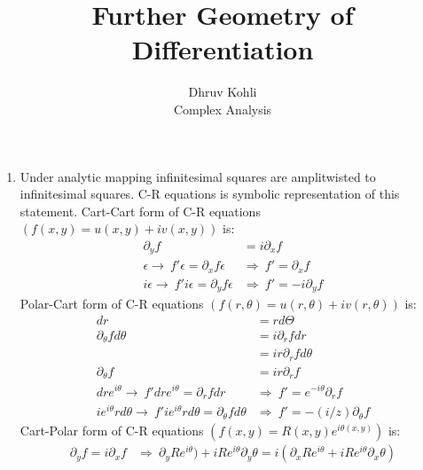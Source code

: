 \documentclass[12pt]{article}
\newcommand{\rto}{\rightarrow\ }
\newcommand{\Rto}{\Rightarrow\ }
\begin{document}
     
     
    \title{Further Geometry of Differentiation}%
    \author{Dhruv Kohli\\ %
    Complex Analysis} %
     
    \maketitle
    \begin{enumerate}
        \item Under analytic mapping infinitesimal squares are amplitwisted to infinitesimal squares. C-R equations is symbolic representation of this statement. Cart-Cart form of C-R equations $(f(x,y) = u(x,y)+iv(x,y))$ is:
        \begin{align*}
            \partial_{y}f &= i \partial_{x}f\\
            \epsilon \rto f' \epsilon = \partial_{x}f \epsilon &\Rto f' = \partial_{x}f\\
            i\epsilon \rto f' i\epsilon = \partial_{y}f \epsilon &\Rto f' = -i\partial_{y}f
        \end{align*}
        Polar-Cart form of C-R equations $(f(r,\theta) = u(r,\theta)+iv(r,\theta))$ is:
        \begin{align*}
            dr &= rd\Theta\\
            \partial_{\theta}fd\theta &= i \partial_{r}f dr\\
            &= ir \partial_{r}fd\theta\\
            \partial_{\theta}f &= ir\partial_{r}f\\
            dr e^{i\theta} \rto f' dr e^{i\theta} = \partial_{r}f dr &\Rto f' = e^{-i\theta}\partial_{r}f\\
            ie^{i\theta}rd\theta \rto f' ie^{i\theta}rd\theta = \partial_{\theta}fd\theta &\Rto f' = -(i/z)\partial_{\theta}f
        \end{align*}
        Cart-Polar form of C-R equations $(f(x,y) = R(x,y)e^{i\theta(x,y)})$ is:
        \begin{align*}
            \partial_{y}f = i\partial_{x}f &\Rto \partial_{y}R e^{i\theta}) + iRe^{i\theta} \partial_{y}\theta = i(\partial_{x}R e^{i\theta} + iRe^{i\theta} \partial_{x}\theta)\\

\end{align*}
\end{enumerate}
\end{document}
